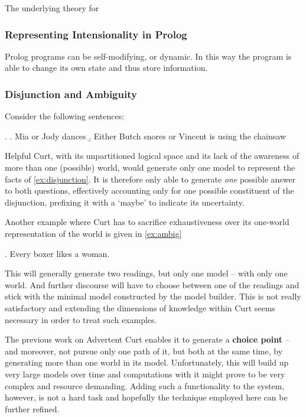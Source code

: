 \documentclass[11pt,a4paper]{article}
\newcommand{\term}[1]{\textsf{\textbf{#1}}} %
\newcommand{\pn}{\textsf} %
\newcommand{\curt}{\pn{Curt}}
\newcommand{\acurt}{\pn{Advertent Curt}}
\newcommand{\prol}{\pn{Prolog}}
\theoremstyle{remark}
\theoremstyle{remark}
\theoremstyle{definition}
\begin{document}
The underlying theory for 

\subsubsection{Representing Intensionality in \prol{}}

\prol{} programs can be self-modifying, or dynamic. In this way the program is
able to change its own state and thus store information.

\subsubsection{Disjunction and Ambiguity}
Consider the following sentences:

\ex. \label{ex:disjunction} \a. Mia or Jody dances
\b. Either Butch snores or Vincent is using the chainsaw

\pn{Helpful Curt}, with its unpartitioned logical space and its lack of
the awareness of more than one (possible) world, would generate only one model
to represent the facts of \ref{ex:disjunction}. It is therefore only able to
generate \emph{one} possible answer to both questions, effectively accounting only
for one possible constituent of the disjunction, prefixing it with a `maybe' to
indicate its uncertainty.

Another example where \curt{} has to sacrifice exhaustiveness over its one-world
representation of the world is given in \ref{ex:ambig}

\ex.\label{ex:ambig} Every boxer likes a woman.

This will generally generate two readings, but only one model -- with only one
world. And further discourse will have to choose between one of the readings and
stick with the minimal model constructed by the model builder. This is not
really satisfactory and extending the dimensions of knowledge within \curt{} seems
necessary in order to treat such examples.

The previous work on \acurt{} enables it to generate a \term{choice point} -- and
moreover, not pursue only one path of it, but both at the same time, by
generating more than one world in its model.
Unfortunately, this will build up very large models over time and computations
with it might prove to be very complex and resource demanding. Adding such a
functionality to the system, however, is not a hard task and hopefully the
technique employed here can be further refined. %
\end{document}
